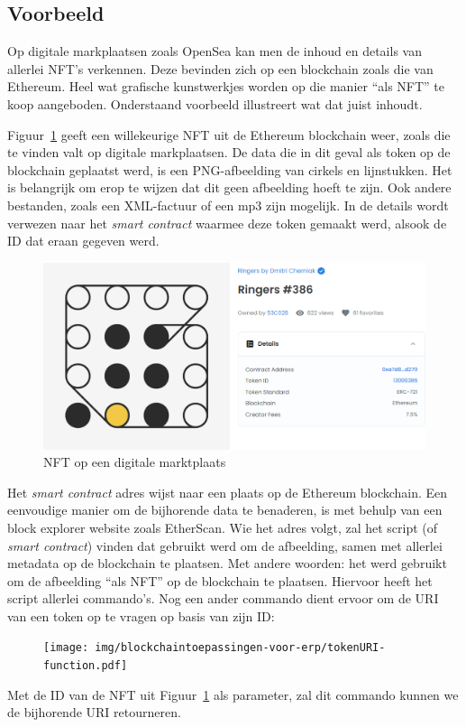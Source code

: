 \subsection{Voorbeeld}
\label{sub:voorbeeld}

Op digitale markplaatsen zoals OpenSea kan men de inhoud en details van allerlei NFT's verkennen. Deze bevinden zich op een blockchain zoals die van Ethereum. Heel wat grafische kunstwerkjes worden op die manier ``als NFT'' te koop aangeboden. Onderstaand voorbeeld illustreert wat dat juist inhoudt.

Figuur~\ref{fig:nft-example} geeft een willekeurige NFT uit de Ethereum blockchain weer, zoals die te vinden valt op digitale markplaatsen. De data die in dit geval als token op de blockchain geplaatst werd, is een PNG-afbeelding van cirkels en lijnstukken. Het is belangrijk om erop te wijzen dat dit geen afbeelding hoeft te zijn. Ook andere bestanden, zoals een XML-factuur of een mp3 zijn mogelijk. In de details wordt verwezen naar het \textit{smart contract} waarmee deze token gemaakt werd, alsook de ID dat eraan gegeven werd.

\begin{figure}[H]
	\centering
	\includegraphics[width=\linewidth]{img/blockchaintoepassingen-voor-erp/nft-example.png}
	\caption{\label{fig:nft-example}NFT op een digitale marktplaats}
\end{figure}

Het \textit{smart contract} adres wijst naar een plaats op de Ethereum blockchain. Een eenvoudige manier om de bijhorende data te benaderen, is met behulp van een block explorer website zoals EtherScan. Wie het adres volgt, zal het script (of \textit{smart contract}) vinden dat gebruikt werd om de afbeelding, samen met allerlei metadata op de blockchain te plaatsen. Met andere woorden: het werd gebruikt om de afbeelding ``als NFT'' op de blockchain te plaatsen. Hiervoor heeft het script allerlei commando's. Nog een ander commando dient ervoor om de URI van een token op te vragen op basis van zijn ID:
\begin{figure}[H]
	\centering
	\texttt{[image: img/blockchaintoepassingen-voor-erp/tokenURI-function.pdf]}
\end{figure}
Met de ID van de NFT uit Figuur~\ref{fig:nft-example} als parameter, zal dit commando kunnen we de bijhorende URI retourneren.

